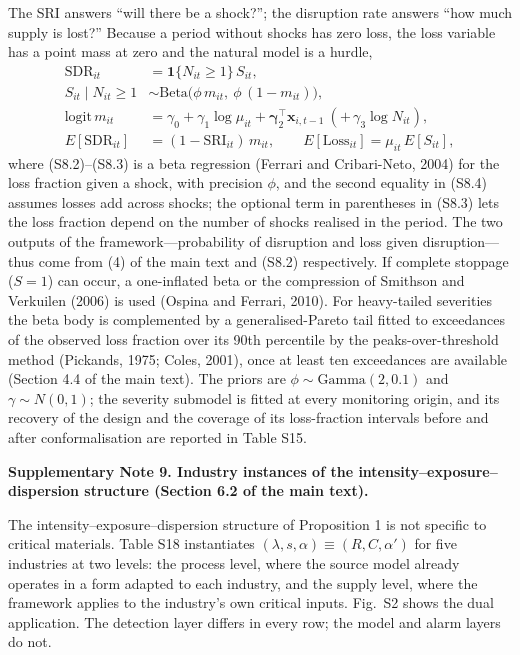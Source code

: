 The SRI answers ``will there be a shock?''; the disruption rate answers ``how much supply is lost?'' Because a period without shocks has zero loss, the loss variable has a point mass at zero and the natural model is a hurdle,
\begin{align}\mathrm{SDR}_{it} &= \mathbf{1}\{N_{it}\ge 1\}\,S_{it}, \tag{S8.1}\\ S_{it}\mid N_{it}\ge 1 &\sim \mathrm{Beta}\big(\phi\,m_{it},\ \phi\,(1-m_{it})\big), \tag{S8.2}\\ \mathrm{logit}\,m_{it} &= \gamma_{0} + \gamma_{1}\log\mu_{it} + \boldsymbol{\gamma}_{2}^{\top}\mathbf{x}_{i,t-1}\ (+\,\gamma_{3}\log N_{it}), \tag{S8.3}\\ E[\mathrm{SDR}_{it}] &= (1-\mathrm{SRI}_{it})\,m_{it},\qquad E[\mathrm{Loss}_{it}] = \mu_{it}\,E[S_{it}], \tag{S8.4}\end{align}
where (S8.2)–(S8.3) is a beta regression (Ferrari and Cribari-Neto, 2004) for the loss fraction given a shock, with precision $\phi$, and the second equality in (S8.4) assumes losses add across shocks; the optional term in parentheses in (S8.3) lets the loss fraction depend on the number of shocks realised in the period. The two outputs of the framework---probability of disruption and loss given disruption---thus come from (4) of the main text and (S8.2) respectively. If complete stoppage ($S = 1$) can occur, a one-inflated beta or the compression of Smithson and Verkuilen (2006) is used (Ospina and Ferrari, 2010). For heavy-tailed severities the beta body is complemented by a generalised-Pareto tail fitted to exceedances of the observed loss fraction over its 90th percentile by the peaks-over-threshold method (Pickands, 1975; Coles, 2001), once at least ten exceedances are available (Section 4.4 of the main text). The priors are $\phi \sim \mathrm{Gamma}(2, 0.1)$ and $\gamma \sim N(0,1)$; the severity submodel is fitted at every monitoring origin, and its recovery of the design and the coverage of its loss-fraction intervals before and after conformalisation are reported in Table S15.

\textbf{Supplementary Note 9. Industry instances of the intensity–exposure–dispersion structure (Section 6.2 of the main text).}

The intensity–exposure–dispersion structure of Proposition 1 is not specific to critical materials. Table S18 instantiates $(\lambda, s, \alpha) \equiv (R, C, \alpha')$ for five industries at two levels: the process level, where the source model already operates in a form adapted to each industry, and the supply level, where the framework applies to the industry's own critical inputs. Fig.~S2 shows the dual application. The detection layer differs in every row; the model and alarm layers do not.

